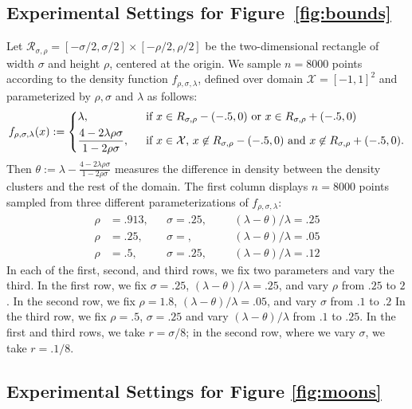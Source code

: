 \documentclass[twoside,11pt]{article}
\newcommand{\1}{\mathbf{1}}
\newcommand{\mc}[1]{\mathcal{#1}}
\begin{document}
\subsection{Experimental Settings for Figure~\ref{fig:bounds}}
Let $\mc{R}_{\sigma,\rho} = [-\sigma/2,\sigma/2] \times [-\rho/2,\rho/2]$ be the two-dimensional rectangle of width $\sigma$ and height $\rho$, centered at the origin. We sample $n = 8000$ points according to the density function $f_{\rho,\sigma,\lambda}$, defined over domain $\mc{X} = [-1,1]^2$ and parameterized by $\rho, \sigma$ and $\lambda$ as follows:
\begin{equation}
f_{\rho,\sigma,\lambda}(x) :=
\begin{dcases}
\lambda,~~& \textrm{if $x \in R_{\sigma,\rho} - (-.5,0)$ or $x \in R_{\sigma,\rho} + (-.5,0)$} \\
\frac{4 - 2 \lambda \rho \sigma}{1 - 2\rho\sigma},~~& \textrm{if $x \in \mc{X}$, $x \not\in R_{\sigma,\rho} - (-.5,0)$ and $x \not\in R_{\sigma,\rho} + (-.5,0)$.}
\end{dcases}
\end{equation}
Then $\theta := \lambda - \frac{4 - 2 \lambda \rho \sigma}{1 - 2\rho\sigma}$ measures the difference in density between the density clusters and the rest of the domain. The first column displays $n = 8000$ points sampled from three different parameterizations of $f_{\rho,\sigma,\lambda}$:
\begin{align*}
\rho &= .913, &&\sigma = .25, &&&(\lambda - \theta)/\lambda = .25 \tag{top panel} \\
\rho &= .25, &&\sigma = , &&&(\lambda - \theta)/\lambda = .05 \tag{middle panel} \\
\rho &= .5, &&\sigma = .25, &&&(\lambda - \theta)/\lambda = .12 \tag{bottom panel.}
\end{align*}
In each of the first, second, and third rows, we fix two parameters and vary the third. In the first row, we fix $\sigma = .25$, $(\lambda - \theta)/\lambda = .25$, and vary $\rho$ from $.25$ to $2$. In the second row, we fix $\rho = 1.8$, $(\lambda - \theta)/\lambda = .05$, and vary $\sigma$ from $.1$ to $.2$ In the third row, we fix $\rho = .5$, $\sigma = .25$ and vary $(\lambda - \theta)/\lambda$ from $.1$ to $.25$. In the first and third rows, we take $r = \sigma/8$; in the second row, where we vary $\sigma$, we take $r = .1/8$. 

\subsection{Experimental Settings for Figure \ref{fig:moons}}
\end{document}
